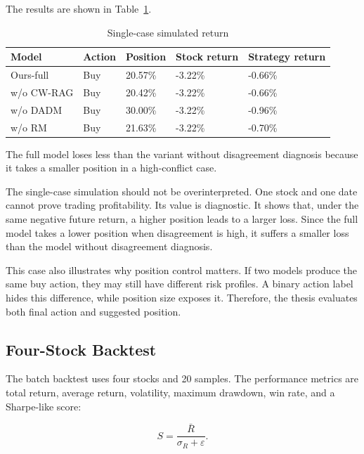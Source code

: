 \documentclass[14pt,a4paper]{extarticle}
\begin{document}
The results are shown in Table~\ref{tab:singlecase}.

\begin{table}[H]
\caption{Single-case simulated return}
\label{tab:singlecase}
\centering
\begin{tabular}{|p{}|p{}|p{}|p{}|p{}|}
\hline
Model & Action & Position & Stock return & Strategy return \\
\hline
Ours-full & Buy & 20.57\% & -3.22\% & -0.66\% \\
\hline
w/o CW-RAG & Buy & 20.42\% & -3.22\% & -0.66\% \\
\hline
w/o DADM & Buy & 30.00\% & -3.22\% & -0.96\% \\
\hline
w/o RM & Buy & 21.63\% & -3.22\% & -0.70\% \\
\hline
\end{tabular}
\end{table}

The full model loses less than the variant without disagreement diagnosis because it takes a smaller position in a high-conflict case.

The single-case simulation should not be overinterpreted. One stock and one date cannot prove trading profitability. Its value is diagnostic. It shows that, under the same negative future return, a higher position leads to a larger loss. Since the full model takes a lower position when disagreement is high, it suffers a smaller loss than the model without disagreement diagnosis.

This case also illustrates why position control matters. If two models produce the same buy action, they may still have different risk profiles. A binary action label hides this difference, while position size exposes it. Therefore, the thesis evaluates both final action and suggested position.

\subsection{Four-Stock Backtest}

The batch backtest uses four stocks and 20 samples. The performance metrics are total return, average return, volatility, maximum drawdown, win rate, and a Sharpe-like score:

\begin{equation}
S=\frac{\bar{R}}{\sigma_R+\varepsilon}.
\label{eq:sharpe-like}
\end{equation}
\end{document}
